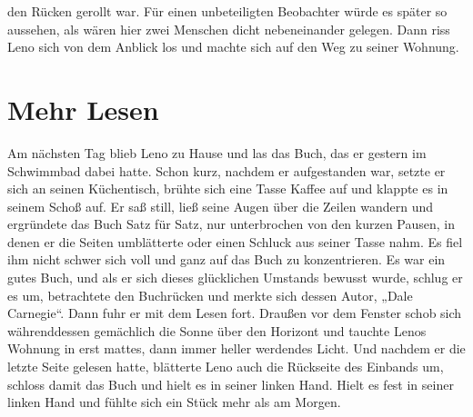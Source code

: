 \documentclass[ngerman,smalldemyvopaper,11pt,oneside,onecolumn,openright,extrafontsizes]{memoir}
\begin{document}
den Rücken gerollt war. Für einen unbeteiligten Beobachter würde es später so aussehen, als wären hier zwei Menschen dicht nebeneinander gelegen. Dann riss Leno sich von dem Anblick los und machte sich auf den Weg zu seiner Wohnung.
\chapter{Mehr Lesen}
Am nächsten Tag blieb Leno zu Hause und las das Buch, das er gestern im Schwimmbad dabei hatte. Schon kurz, nachdem er aufgestanden war, setzte er sich an seinen Küchentisch, brühte sich eine Tasse Kaffee auf und klappte es in seinem Schoß auf. Er saß still, ließ seine Augen über die Zeilen wandern und ergründete das Buch Satz für Satz, nur unterbrochen von den kurzen Pausen, in denen er die Seiten umblätterte oder einen Schluck aus seiner Tasse nahm. Es fiel ihm nicht schwer sich voll und ganz auf das Buch zu konzentrieren. Es war ein gutes Buch, und als er sich dieses glücklichen Umstands bewusst wurde, schlug er es um, betrachtete den Buchrücken und merkte sich dessen Autor, „Dale Carnegie“. Dann fuhr er mit dem Lesen fort. Draußen vor dem Fenster schob sich währenddessen gemächlich die Sonne über den Horizont und tauchte Lenos Wohnung in erst mattes, dann immer heller werdendes Licht. Und nachdem er die letzte Seite gelesen hatte, blätterte Leno auch die Rückseite des Einbands um, schloss damit das Buch und hielt es in seiner linken Hand. Hielt es fest in seiner linken Hand und fühlte sich ein Stück mehr als am Morgen.\\
\end{document}
